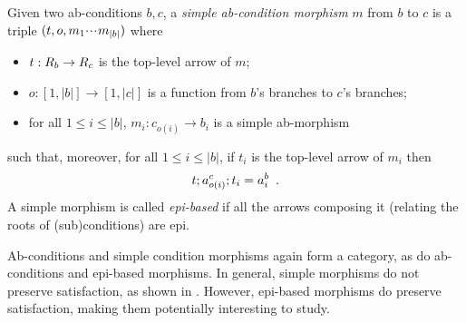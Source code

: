 \begin{definition}
  Given two ab-conditions $b,c$, a \emph{simple ab-condition morphism} $m$ from $b$ to $c$ is a triple $(t,o,m_1{\cdotp\mkern-2mu\cdotp\mkern-2mu\cdotp\mkern1mu} m_{|b|})$ where
    \begin{itemize}
    \item $t:R_b\rightarrow R_c$ is the top-level arrow of $m$;
	\item $o:[1,|b|]\to[1,|c|]$ is a function from $b$'s branches to $c$'s branches;
  \item for all $1\leq i\leq |b|$, $m_i:c_{o(i)}\to b_i$ is a simple ab-morphism
  \end{itemize}
  such that, moreover, for all $1\leq i\leq |b|$, if $t_i$ is the top-level arrow of $m_i$ then
  \begin{equation}\eqlabel{simple ab-morphism}
  t;a^c_{o(i)};t_i=a^b_i \enspace.
  \end{equation}
  A simple morphism is called \emph{epi-based} if all the arrows composing it (relating the roots of (sub)conditions) are epi.
\end{definition}
%
Ab-conditions and simple condition morphisms again form a category, as do ab-conditions and epi-based morphisms.
In general, simple morphisms do not preserve satisfaction, as shown in . However, epi-based morphisms do preserve satisfaction, making them potentially interesting to study.

